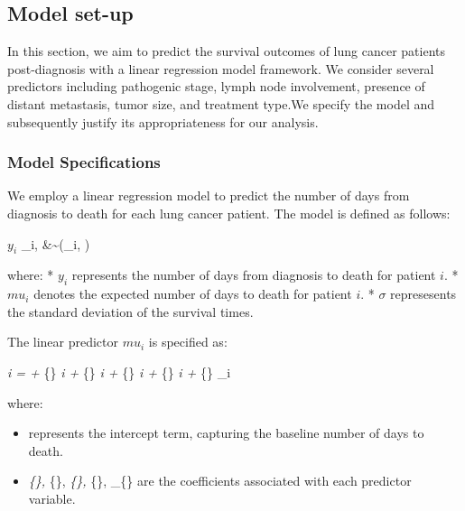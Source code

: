 \documentclass[
  letterpaper,
  DIV=11,
  numbers=noendperiod]{scrartcl}
\providecommand{\tightlist}{%
  \setlength{\itemsep}{0pt}\setlength{\parskip}{0pt}}\usepackage{longtable,booktabs,array}
\begin{document}
\hypertarget{model-set-up}{%
\subsection{Model set-up}\label{model-set-up}}

In this section, we aim to predict the survival outcomes of lung cancer
patients post-diagnosis with a linear regression model framework. We
consider several predictors including pathogenic stage, lymph node
involvement, presence of distant metastasis, tumor size, and treatment
type.We specify the model and subsequently justify its appropriateness
for our analysis.

\hypertarget{model-specifications}{%
\subsubsection{Model Specifications}\label{model-specifications}}

We employ a linear regression model to predict the number of days from
diagnosis to death for each lung cancer patient. The model is defined as
follows:

\(y_i\) \textbar{} \mu\_i, \sigma \&\sim {}(\mu\_i, \sigma)

where: * \(y_i\) represents the number of days from diagnosis to death
for patient \(i\). * \(mu_i\) denotes the expected number of days to
death for patient \(i\). * \(σ\) represesents the standard deviation of
the survival times.

The linear predictor \(mu_i\) is specified as:

\mu\emph{i = \alpha + \beta}\{\}
\times {}\emph{i + \beta}\{\}
\times {}\emph{i +
\beta}\{\}
\times {}\emph{i +
\beta}\{\} \times {}\emph{i +
\beta}\{\} \times {}\_i

where:

\begin{itemize}
\tightlist
\item
  \alpha represents the intercept term, capturing the baseline number of
  days to death.
\item
  \beta\emph{\{\}, \beta}\{\},
  \beta\emph{\{\}, \beta}\{\},
  \beta\_\{\} are the coefficients associated with
  each predictor variable.
\end{itemize}
\end{document}
